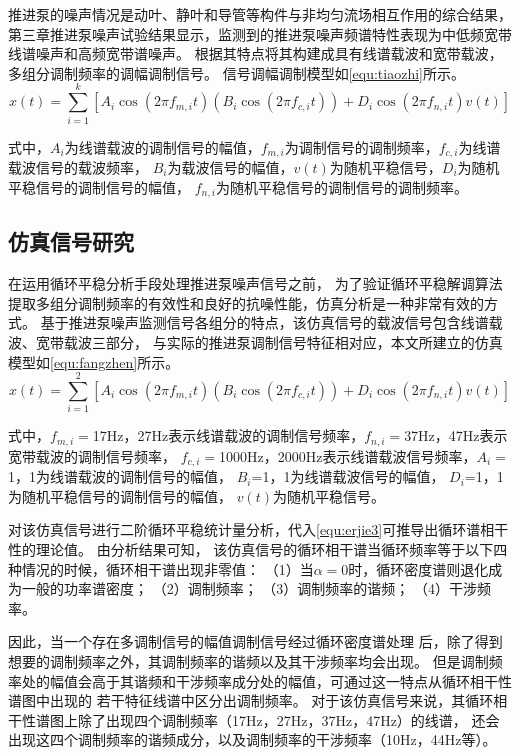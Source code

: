 推进泵的噪声情况是动叶、静叶和导管等构件与非均匀流场相互作用的综合结果，
第三章推进泵噪声试验结果显示，监测到的推进泵噪声频谱特性表现为中低频宽带线谱噪声和高频宽带谱噪声。
根据其特点将其构建成具有线谱载波和宽带载波，多组分调制频率的调幅调制信号\cite{Tarkan2013PREDICTION}。
信号调幅调制模型如\autoref{equ:tiaozhi}所示。
\begin{equation}
    \label{equ:tiaozhi}
    x\left ( t \right ) =\sum_{i=1}^{k}\left [ A_{i}\cos \left ( 2\pi f_{m,i}t  \right )\left ( B_{i}\cos\left ( 2\pi f_{c,i}t  \right )   \right )+D_{i}\cos\left ( 2\pi f_{n,i}t  \right )v\left ( t \right )      \right ]  
\end{equation}

式中，$A_i$为线谱载波的调制信号的幅值，$f_{m,i}$为调制信号的调制频率，$f_{c,i}$为线谱载波信号的载波频率，
$B_i$为载波信号的幅值，$v\left ( t \right )$为随机平稳信号，$D_i$为随机平稳信号的调制信号的幅值，
$f_{n,i}$为随机平稳信号的调制信号的调制频率。
\subsection{仿真信号研究}
在运用循环平稳分析手段处理推进泵噪声信号之前，
为了验证循环平稳解调算法提取多组分调制频率的有效性和良好的抗噪性能，仿真分析是一种非常有效的方式。
基于推进泵噪声监测信号各组分的特点，该仿真信号的载波信号包含线谱载波、宽带载波三部分，
与实际的推进泵调制信号特征相对应，本文所建立的仿真模型如\autoref{equ:fangzhen}所示。 
\begin{equation}
    \label{equ:fangzhen}
    x\left ( t \right ) =\sum_{i=1}^{2}\left [ A_{i}\cos \left ( 2\pi f_{m,i}t  \right )\left ( B_{i}\cos\left ( 2\pi f_{c,i}t  \right )   \right )+D_{i}\cos\left ( 2\pi f_{n,i}t  \right )v\left ( t \right )      \right ]  
\end{equation}

式中，$f_{m,i}=$17Hz，27Hz表示线谱载波的调制信号频率，$f_{n,i}=$37Hz，47Hz表示宽带载波的调制信号频率，
$f_{c,i}=$1000Hz，2000Hz表示线谱载波信号频率，$A_i=$1，1为线谱载波的调制信号的幅值，
$B_i$=1，1为线谱载波信号的幅值，
$D_i$=1，1为随机平稳信号的调制信号的幅值，
$v\left ( t \right )$为随机平稳信号。

对该仿真信号进行二阶循环平稳统计量分析，代入\autoref{equ:erjie3}可推导出循环谱相干性的理论值。
由分析结果可知，
该仿真信号的循环相干谱当循环频率等于以下四种情况的时候，循环相干谱出现非零值：
（1）当$\alpha=0$时，循环密度谱则退化成为一般的功率谱密度；
（2）调制频率；
（3）调制频率的谐频；
（4）干涉频率。

因此，当一个存在多调制信号的幅值调制信号经过循环密度谱处理
后，除了得到想要的调制频率之外，其调制频率的谐频以及其干涉频率均会出现。
但是调制频率处的幅值会高于其谐频和干涉频率成分处的幅值，可通过这一特点从循环相干性谱图中出现的
若干特征线谱中区分出调制频率。
对于该仿真信号来说，其循环相干性谱图上除了出现四个调制频率（17Hz，27Hz，37Hz，47Hz）的线谱，
还会出现这四个调制频率的谐频成分，以及调制频率的干涉频率（10Hz，44Hz等）。

